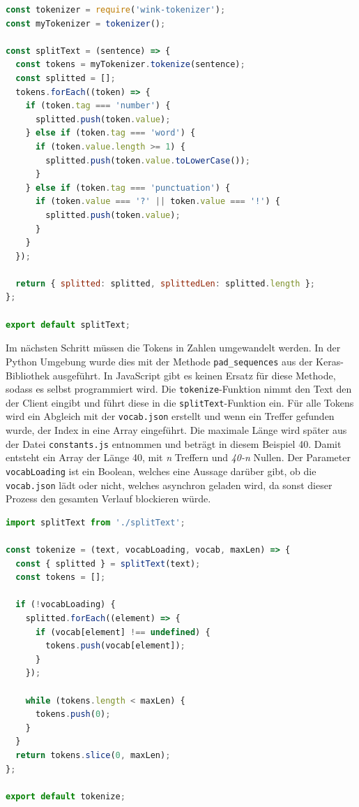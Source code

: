 \begin{lstlisting}[language=JavaScript, caption=Die splitText Funktion, label={splitText}]
const tokenizer = require('wink-tokenizer');
const myTokenizer = tokenizer();

const splitText = (sentence) => {
  const tokens = myTokenizer.tokenize(sentence);
  const splitted = [];
  tokens.forEach((token) => {
    if (token.tag === 'number') {
      splitted.push(token.value);
    } else if (token.tag === 'word') {
      if (token.value.length >= 1) {
        splitted.push(token.value.toLowerCase());
      }
    } else if (token.tag === 'punctuation') {
      if (token.value === '?' || token.value === '!') {
        splitted.push(token.value);
      }
    }
  });

  return { splitted: splitted, splittedLen: splitted.length };
};

export default splitText;
\end{lstlisting}

Im nächsten Schritt müssen die Tokens in Zahlen umgewandelt werden. In der Python Umgebung wurde dies mit der Methode \texttt{pad\_sequences} aus der Keras-Bibliothek ausgeführt. In JavaScript gibt es keinen Ersatz für diese Methode, sodass es selbst programmiert wird. Die \texttt{tokenize}-Funktion nimmt den Text den der Client eingibt und führt diese in die \texttt{splitText}-Funktion ein. Für alle Tokens wird ein Abgleich mit der \texttt{vocab.json} erstellt und wenn ein Treffer gefunden wurde, der Index in eine Array eingeführt. Die maximale Länge wird später aus der Datei \texttt{constants.js} entnommen und beträgt in diesem Beispiel 40. Damit entsteht ein Array der Länge 40, mit \textit{n} Treffern und \textit{40-n} Nullen. Der Parameter \texttt{vocabLoading} ist ein Boolean, welches eine Aussage darüber gibt, ob die \texttt{vocab.json} lädt oder nicht, welches asynchron geladen wird, da sonst dieser Prozess den gesamten Verlauf blockieren würde. 


\begin{lstlisting}[language=JavaScript, caption=Die tokenize Funktion, label={tokenizejs}]
import splitText from './splitText';

const tokenize = (text, vocabLoading, vocab, maxLen) => {
  const { splitted } = splitText(text);
  const tokens = [];

  if (!vocabLoading) {
    splitted.forEach((element) => {
      if (vocab[element] !== undefined) {
        tokens.push(vocab[element]);
      }
    });

    while (tokens.length < maxLen) {
      tokens.push(0);
    }
  }
  return tokens.slice(0, maxLen);
};

export default tokenize;
\end{lstlisting}

